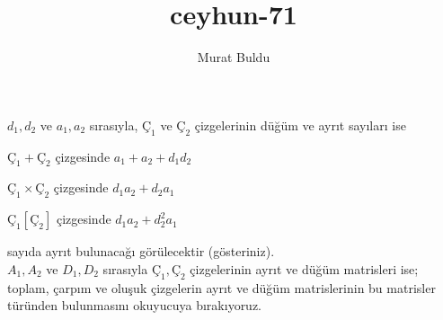 \documentclass[11pt]{amsbook}
\title{ceyhun-71}
\author{Murat Buldu}
\begin{document}
\(d_1, d_2\) ve \(a_1, a_2\) sırasıyla, \(Ç_1\) ve \(Ç_2\) çizgelerinin düğüm ve ayrıt sayıları ise 
\begin{hEnumerateAlpha}
    \item 
        \(Ç_1 + Ç_2\) çizgesinde \(a_1 + a_2 + d_1 d_2\)
    \item 
        \(Ç_1 \times Ç_2\) çizgesinde \(d_1 a_2 + d_2 a_1\)
    \item
        \(Ç_1 [Ç_2] \) çizgesinde \(d_1 a_2 + d_2^2 a_1\)
\end{hEnumerateAlpha}
sayıda ayrıt bulunacağı görülecektir (gösteriniz). \\
\(A_1, A_2\) ve \(D_1, D_2\) sırasıyla \(Ç_1, Ç_2\) çizgelerinin ayrıt ve düğüm matrisleri ise; toplam, çarpım ve oluşuk çizgelerin ayrıt ve düğüm matrislerinin bu matrisler türünden bulunmasını okuyucuya bırakıyoruz. 
\end{document}
